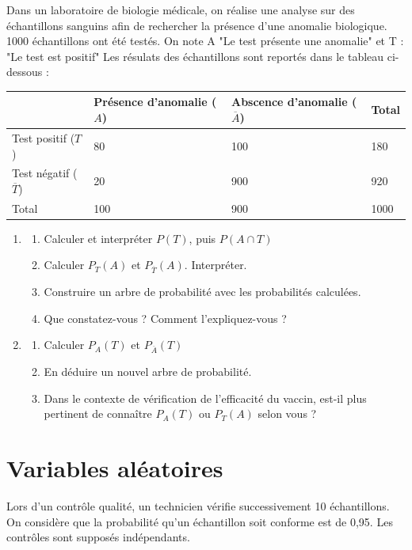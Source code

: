 \documentclass[10pt,a4paper]{article}
\begin{document}
\begin{multicols}{2}
\begin{exo}[][ccf]
    Dans un laboratoire de biologie médicale, on réalise une analyse sur des échantillons sanguins afin de rechercher la présence d'une anomalie biologique. 1000 échantillons ont été testés. \medskip
    On note A "Le test présente une anomalie" et T : "Le test est positif" \medskip
    Les résulats des échantillons sont reportés dans le tableau ci-dessous :
    \begin{tabular}{|C{0.07\textwidth}|C{0.1\textwidth}|C{0.1\textwidth}|C{0.07\textwidth}|}
        \hline
         & Présence d'anomalie ($A$) & Abscence d'anomalie ($\overline{A}$) & Total \\ \hline
         Test positif ($T$) & 80 & 100 & 180 \\
         \hline
        Test négatif ($\overline{T}$) & 20 & 900 & 920 \\ \hline
        Total & 100 & 900 & 1000 \\
        \hline
    \end{tabular}

    \begin{enumerate}
        \item \begin{enumerate}
            \item Calculer et interpréter $P(T)$, puis $P(A\cap T)$
            \item Calculer $P_T(A)$ et $P_{\overline{T}}(A)$. Interpréter.
            \item Construire un arbre de probabilité avec les probabilités calculées.
            \item Que constatez-vous ? Comment l'expliquez-vous ?
        \end{enumerate}
        \item \begin{enumerate}
            \item Calculer $P_A(T)$ et $P_{\overline{A}}(T)$
            \item En déduire un nouvel arbre de probabilité.
            \item Dans le contexte de vérification de l'efficacité du vaccin, est-il plus pertinent de connaître $P_A(T)$ ou $P_T(A)$ selon vous ?
        \end{enumerate}
    \end{enumerate}
\end{exo}

\section{Variables aléatoires}
\begin{exo}
Lors d'un contrôle qualité, un technicien vérifie successivement 10 échantillons. On considère que la probabilité qu'un échantillon soit conforme est de 0,95. Les contrôles sont supposés indépendants.


\end{exo}
\end{multicols}
\end{document}

